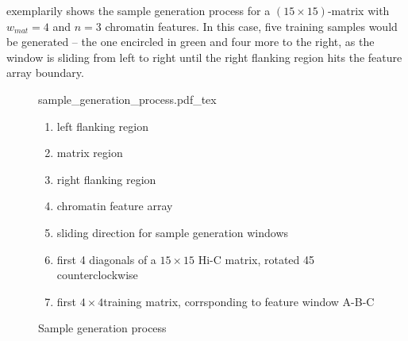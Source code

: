  exemplarily shows the sample generation process for a $(15\times15)$-matrix with $w_{mat}=4$ and $n=3$ chromatin features.
In this case, five training samples would be generated -- the one encircled in green and four more to the right, as the window is sliding from left to right until the
right flanking region hits the feature array boundary.
\begin{figure}[hbp]
 \begin{minipage}{0.60\textwidth}
   \centering
    \small
    {sample_generation_process.pdf_tex}
    \caption{Sample generation process}
    \label{fig:methods:sample_gen}
 \end{minipage}\hfill
 \begin{minipage}{0.3\textwidth}
 \scriptsize
  \begin{enumerate}[label=\Alph*:,leftmargin=*]
   \raggedright
    \item left flanking region
    \item matrix region
    \item right flanking region
    \item chromatin feature array
    \item sliding direction for sample generation windows
    \item first 4 diagonals of a $15\times15$ Hi-C matrix, rotated \SI{45}{\deg} counterclockwise
    \item first $4\times4$training matrix, corrsponding to feature window A-B-C
\end{enumerate}
 \end{minipage}
\end{figure}

